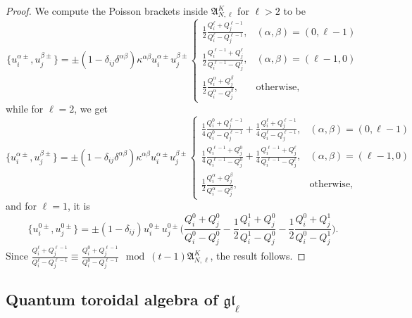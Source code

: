 \begin{proof}
    We compute the Poisson brackets inside $\mathfrak{A}_{N,\ell}^K$ for $\ell > 2$ to be
    \begin{equation*}
        \{ u_i^{\alpha\pm},u_j^{\beta\pm} \} = \pm(1-\delta_{ij}\delta^{\alpha\beta}) \kappa^{\alpha\beta} u_i^{\alpha\pm} u_j^{\beta\pm}
        \begin{cases}
            \frac{1}{2} \frac{Q_i^\ell+Q_j^{\ell-1}}{Q_i^\ell-Q_j^{\ell-1}}, & (\alpha,\beta) = (0,\ell-1) \\
            \frac{1}{2} \frac{Q_i^{\ell-1}+Q_j^\ell}{Q_i^{\ell-1}-Q_j^\ell}, & (\alpha,\beta) = (\ell-1,0) \\
            \frac{1}{2} \frac{Q_i^\alpha+Q_j^\beta}{Q_i^\alpha-Q_j^\beta}, & \text{otherwise},
        \end{cases}
    \end{equation*}
    while for $\ell=2$, we get
    \begin{equation*}
        \{ u_i^{\alpha\pm},u_j^{\beta\pm} \} = \pm(1-\delta_{ij}\delta^{\alpha\beta})\kappa^{\alpha\beta} u_i^{\alpha\pm} u_j^{\beta\pm}
        \begin{cases}
            \frac{1}{4} \frac{Q_i^0+Q_j^{\ell-1}}{Q_i^0-Q_j^{\ell-1}} + \frac{1}{4} \frac{Q_i^\ell+Q_j^{\ell-1}}{Q_i^\ell-Q_j^{\ell-1}}, & (\alpha,\beta) = (0,\ell-1) \\
            \frac{1}{4} \frac{Q_i^{\ell-1}+Q_j^0}{Q_i^{\ell-1}-Q_j^0} + \frac{1}{4} \frac{Q_i^{\ell-1}+Q_j^\ell}{Q_i^{\ell-1}-Q_j^\ell}, & (\alpha,\beta) = (\ell-1,0) \\
            \frac{1}{2} \frac{Q_i^\alpha+Q_j^\beta}{Q_i^\alpha-Q_j^\beta}, & \text{otherwise},
        \end{cases}
    \end{equation*}
    and for $\ell=1$, it is
    \begin{equation*}
        \{ u_i^{0\pm},u_j^{0\pm} \} = \pm(1-\delta_{ij})u_i^{0\pm} u_j^{0\pm} \bigg( \frac{Q_i^0+Q_j^0}{Q_i^0-Q_j^0} - \frac{1}{2} \frac{Q_i^1+Q_j^0}{Q_i^1-Q_j^0} - \frac{1}{2} \frac{Q_i^0+Q_j^1}{Q_i^0-Q_j^1} \bigg).
    \end{equation*}
    Since $\frac{Q_i^\ell+Q_j^{\ell-1}}{Q_i^\ell-Q_j^{\ell-1}} \equiv \frac{Q_i^0+Q_j^{\ell-1}}{Q_i^0-Q_j^{\ell-1}} \mod (t-1) \mathfrak{A}_{N,\ell}^K$, the result follows.
\end{proof}

\subsection{Quantum toroidal algebra of $\mathfrak{gl}_\ell$}


